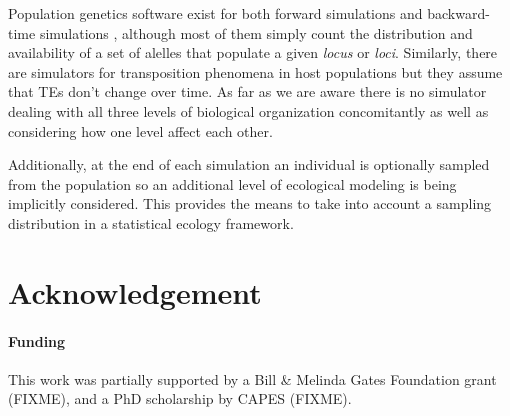 \documentclass{bioinfo}
\begin{document}
Population genetics software exist for both forward simulations
\citep{Car08,GR06,PK05,PMW+08,Her08} and backward-time simulations
\citep{Hud02,TI09}, although most of them simply count the
distribution and availability of a set of alelles that populate a
given {\em locus} or {\em loci}. Similarly, there are simulators for
transposition phenomena in host populations \citep{DLC+06} but they
assume that TEs don't change over time. %
As far as we are aware there is no simulator dealing with all three
levels of biological organization concomitantly as well as considering
how one level affect each other.

Additionally, at the end of each simulation an individual is
optionally sampled from the population so an additional level of
ecological modeling is being implicitly considered. This provides the
means to take into account a sampling distribution in a statistical
ecology framework.



\section*{Acknowledgement}

\paragraph{Funding\textcolon} 

This work was partially supported by a Bill \& Melinda Gates
Foundation grant (FIXME), and a PhD scholarship by CAPES (FIXME).


%
%
%
%
%
%
%





\end{document}
